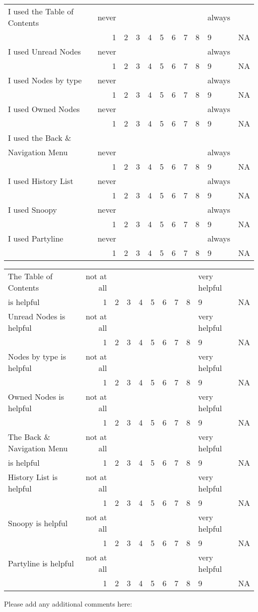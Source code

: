 \begin{tabular}{lrccccccclc}\\
\hline
I used the Table of Contents&never&&&&&&&&always&\\
&1&2&3&4&5&6&7&8&9&NA\\
\hline
I used Unread Nodes&never&&&&&&&&always&\\
&1&2&3&4&5&6&7&8&9&NA\\
\hline
I used Nodes by type&never&&&&&&&&always&\\
&1&2&3&4&5&6&7&8&9&NA\\
\hline
I used Owned Nodes&never&&&&&&&&always&\\
&1&2&3&4&5&6&7&8&9&NA\\
\hline
I used the Back \& &&&&&&&&&&\\Navigation Menu&never&&&&&&&&always&\\
&1&2&3&4&5&6&7&8&9&NA\\
\hline
I used History List&never&&&&&&&&always&\\
&1&2&3&4&5&6&7&8&9&NA\\
\hline
I used Snoopy&never&&&&&&&&always&\\
&1&2&3&4&5&6&7&8&9&NA\\
\hline
I used Partyline&never&&&&&&&&always&\\
&1&2&3&4&5&6&7&8&9&NA\\
\hline
\end{tabular}
\begin{tabular}{lrccccccclc}\\
\hline
The Table of Contents&not at all&&&&&&&&very helpful&\\ 
is helpful&1&2&3&4&5&6&7&8&9&NA\\
\hline
Unread Nodes is helpful&not at all&&&&&&&&very helpful&\\
&1&2&3&4&5&6&7&8&9&NA\\
\hline
Nodes by type is helpful&not at all&&&&&&&&very helpful&\\
&1&2&3&4&5&6&7&8&9&NA\\
\hline
Owned Nodes is helpful&not at all&&&&&&&&very helpful&\\
&1&2&3&4&5&6&7&8&9&NA\\
\hline
The Back \& Navigation Menu&not at all&&&&&&&&very helpful&\\
 is helpful&1&2&3&4&5&6&7&8&9&NA\\
\hline
History List is helpful&not at all&&&&&&&&very helpful&\\
&1&2&3&4&5&6&7&8&9&NA\\
\hline
Snoopy is helpful&not at all&&&&&&&&very helpful&\\
&1&2&3&4&5&6&7&8&9&NA\\
\hline
Partyline is helpful&not at all&&&&&&&&very helpful&\\
&1&2&3&4&5&6&7&8&9&NA\\
\hline

\end{tabular}
Please add any additional comments here:
\normalsize

\newpage


